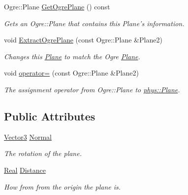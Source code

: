 \begin{DoxyCompactItemize}
Ogre::Plane \hyperlink{classphys_1_1Plane_abbdcdd8d6e7c0d8de92cabd250ff41dc}{GetOgrePlane} () const 
\begin{DoxyCompactList}\small\item\em Gets an Ogre::Plane that contains this Plane's information. \item\end{DoxyCompactList}\item 
void \hyperlink{classphys_1_1Plane_a84b2378666a0e1c791f4f72d8df52c84}{ExtractOgrePlane} (const Ogre::Plane \&Plane2)
\begin{DoxyCompactList}\small\item\em Changes this \hyperlink{classphys_1_1Plane}{Plane} to match the Ogre \hyperlink{classphys_1_1Plane}{Plane}. \item\end{DoxyCompactList}\item 
void \hyperlink{classphys_1_1Plane_ac045b7b0aac024a5fe771786d0c433f7}{operator=} (const Ogre::Plane \&Plane2)
\begin{DoxyCompactList}\small\item\em The assignment operator from Ogre::Plane to \hyperlink{classphys_1_1Plane}{phys::Plane}. \item\end{DoxyCompactList}\end{DoxyCompactItemize}
\subsection*{Public Attributes}
\begin{DoxyCompactItemize}
\item 
\hypertarget{classphys_1_1Plane_ac54624aabcdede3d45e06dd869419c9f}{
\hyperlink{classphys_1_1Vector3}{Vector3} \hyperlink{classphys_1_1Plane_ac54624aabcdede3d45e06dd869419c9f}{Normal}}
\label{d1/d0c/classphys_1_1Plane_ac54624aabcdede3d45e06dd869419c9f}

\begin{DoxyCompactList}\small\item\em The rotation of the plane. \item\end{DoxyCompactList}\item 
\hypertarget{classphys_1_1Plane_ac352595324c4df7f8385c3ad7014e65c}{
\hyperlink{namespacephys_af7eb897198d265b8e868f45240230d5f}{Real} \hyperlink{classphys_1_1Plane_ac352595324c4df7f8385c3ad7014e65c}{Distance}}
\label{d1/d0c/classphys_1_1Plane_ac352595324c4df7f8385c3ad7014e65c}

\begin{DoxyCompactList}\small\item\em How from from the origin the plane is. \item\end{DoxyCompactList}\end{DoxyCompactItemize}



